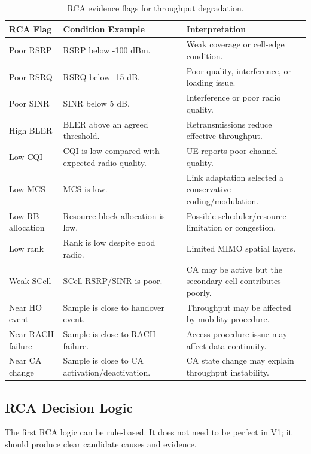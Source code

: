 \documentclass[12pt,a4paper]{article}
\begin{document}
\begin{table}[H]
\centering
\begin{tabularx}{\textwidth}{@{}L{0.26\textwidth}YY@{}}
\toprule
\textbf{RCA Flag} & \textbf{Condition Example} & \textbf{Interpretation} \\
\midrule
Poor RSRP & RSRP below -100 dBm. & Weak coverage or cell-edge condition. \\
Poor RSRQ & RSRQ below -15 dB. & Poor quality, interference, or loading issue. \\
Poor SINR & SINR below 5 dB. & Interference or poor radio quality. \\
High BLER & BLER above an agreed threshold. & Retransmissions reduce effective throughput. \\
Low CQI & CQI is low compared with expected radio quality. & UE reports poor channel quality. \\
Low MCS & MCS is low. & Link adaptation selected a conservative coding/modulation. \\
Low RB allocation & Resource block allocation is low. & Possible scheduler/resource limitation or congestion. \\
Low rank & Rank is low despite good radio. & Limited MIMO spatial layers. \\
Weak SCell & SCell RSRP/SINR is poor. & CA may be active but the secondary cell contributes poorly. \\
Near HO event & Sample is close to handover event. & Throughput may be affected by mobility procedure. \\
Near RACH failure & Sample is close to RACH failure. & Access procedure issue may affect data continuity. \\
Near CA change & Sample is close to CA activation/deactivation. & CA state change may explain throughput instability. \\
\bottomrule
\end{tabularx}
\caption{RCA evidence flags for throughput degradation.}
\end{table}

\subsection{RCA Decision Logic}

The first RCA logic can be rule-based. It does not need to be perfect in V1; it should produce clear candidate causes and evidence.
\end{document}
